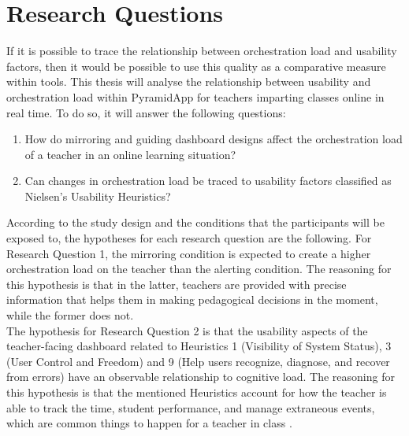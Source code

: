 \normallinespacing

\chapter{Research Questions}
If it is possible to trace the relationship between orchestration load and usability factors, then it would be possible to use this quality as a comparative measure within tools. This thesis will analyse the relationship between usability and orchestration load within PyramidApp for teachers imparting classes online in real time. To do so, it will answer the following questions:
\begin{enumerate}
    \item How do mirroring and guiding dashboard designs affect the orchestration load of a teacher in an online learning situation?
    \item Can changes in orchestration load be traced to usability factors classified as Nielsen's Usability Heuristics?
\end{enumerate}
According to the study design and the conditions that the participants will be exposed to, the hypotheses for each research question are the following. For Research Question 1, the mirroring condition is expected to create a higher orchestration load on the teacher than the alerting condition. The reasoning for this hypothesis is that in the latter, teachers are provided with precise information that helps them in making pedagogical decisions in the moment, while the former does not.\\

The hypothesis for Research Question 2 is that the usability aspects of the teacher-facing dashboard related to Heuristics 1 (Visibility of System Status), 3 (User Control and Freedom) and 9 (Help users recognize, diagnose, and recover from errors) have an observable relationship to cognitive load. The reasoning for this hypothesis is that the mentioned Heuristics account for how the teacher is able to track the time, student performance, and manage extraneous events, which are common things to happen for a teacher in class \cite{Dillenbourg2013-kx}.
\newpage


